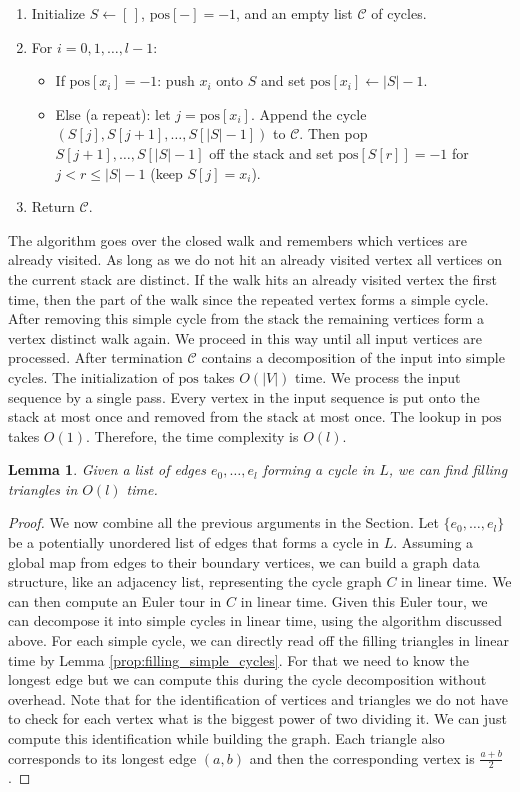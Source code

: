 \documentclass[11pt]{article}
\newtheorem{lemma}[theorem]{Lemma}
\begin{document}
%
\begin{enumerate}
\item Initialize $S\gets[\,]$, $\text{pos}[-]=-1$, and an empty list $\mathcal{C}$ of cycles.
\item For $i=0,1,\dots,l-1$:
  \begin{itemize}
  \item If $\text{pos}[x_i]=-1$: push $x_i$ onto $S$ and set $\text{pos}[x_i]\gets |S|-1$.
  \item Else (a repeat): let $j=\text{pos}[x_i]$. Append the cycle $(S[j], S[j{+}1], \dots, S[|S|-1])$ to $\mathcal{C}$. Then pop $S[j+1],\dots,S[|S|-1]$ off the stack and set $\text{pos}[S[r]]=-1$ for $j< r\leq\vert S\vert-1$ (keep $S[j]=x_i$).
  \end{itemize}
\item Return $\mathcal{C}$.
\end{enumerate}
%
The algorithm goes over the closed walk and remembers which vertices are already visited. As long as we do not hit an already visited vertex all vertices on the current stack are distinct. If the walk hits an already visited vertex the first time, then the part of the walk since the repeated vertex forms a simple cycle. After removing this simple cycle from the stack the remaining vertices form a vertex distinct walk again. We proceed in this way until all input vertices are processed. After termination $\mathcal{C}$ contains a decomposition of the input into simple cycles. The initialization of $\text{pos}$ takes $O(\vert V\vert)$ time. We process the input sequence by a single pass. Every vertex in the input sequence is put onto the stack at most once and removed from the stack at most once. The lookup in $\text{pos}$ takes $O(1)$. Therefore, the time complexity is $O(l)$.   
%
\begin{lemma} \label{prop:cycle_finding}
Given a list of edges $e_0,\ldots,e_l$ forming a cycle in $L$, we can find filling triangles in $O(l)$ time.
\end{lemma}
%
\begin{proof}
We now combine all the previous arguments in the Section. Let $\{e_0,\ldots,e_l\}$ be a potentially unordered list of edges that forms a cycle in $L$. Assuming a global map from edges to their boundary vertices, we can build a graph data structure, like an adjacency list, representing the cycle graph $C$ in linear time. We can then compute an Euler tour in $C$ in linear time. Given this Euler tour, we can decompose it into simple cycles in linear time, using the algorithm discussed above. For each simple cycle, we can directly read off the filling triangles in linear time by Lemma \ref{prop:filling_simple_cycles}. For that we need to know the longest edge but we can compute this during the cycle decomposition without overhead. Note that for the identification of vertices and triangles we do not have to check for each vertex what is the biggest power of two dividing it. We can just compute this identification while building the graph. Each triangle also corresponds to its longest edge $(a,b)$ and then the corresponding vertex is $\frac{a+b}{2}$. 
\end{proof}
%
%
%
\end{document}
